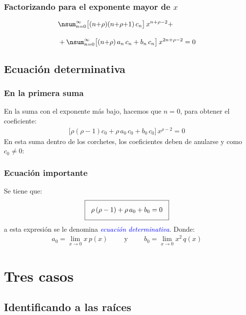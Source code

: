 \documentclass[12pt]{beamer}
\begin{document}
\begin{frame}
\frametitle{Factorizando para el exponente mayor de $x$}
\begin{align*}
&\nsum_{n=0}^{\infty} \big[ (n {+} \rho)(n {+} \rho {+} 1) \, c_{n} \big] \, x^{n+\rho-2} + \\[1em]
&+ \nsum_{n=0}^{\infty} \big[ (n {+} \rho) \, a_{n} \, c_{n} + b_{n} \, c_{n} \big] \, x^{2n+\rho-2} = 0
\end{align*}
\end{frame}

\subsection{Ecuación determinativa}

\begin{frame}
\frametitle{En la primera suma}
En la suma con el exponente más bajo, hacemos que $n = 0$, para obtener el coeficiente:
\pause
\begin{align*}
\big[ \rho (\rho - 1) c_{0} + \rho \, a_{0} \, c_{0} + b_{0} \, c_{0} \big] \, x^{\rho-2} = 0
\end{align*}
\pause
En esta suma dentro de los corchetes, los coeficientes deben de anularse y como $c_{0} \neq 0$:
\end{frame}
\begin{frame}
\frametitle{Ecuación importante}
Se tiene que:
\pause
\begin{align}
\setlength{\fboxsep}{3\fboxsep}\boxed{
\rho \, (\rho - 1) + \rho \, a_{0} + b_{0} = 0 }
\label{eq:ecuacion_17_17}
\end{align}
a esta expresión se le denomina \emph{\textcolor{blue}{ecuación determinativa}}.
Donde:
\pause
\begin{align}
a_{0} = \lim_{x \to 0} x \, p(x) \hspace{1cm} \mbox{y} \hspace{1cm} b_{0} = \lim_{x \to 0} x^{2} \, q(x)
\label{eq:ecuacion_17_18}
\end{align}
\end{frame}

\section{Tres casos}
\subsection{Identificando a las raíces}
\end{document}
